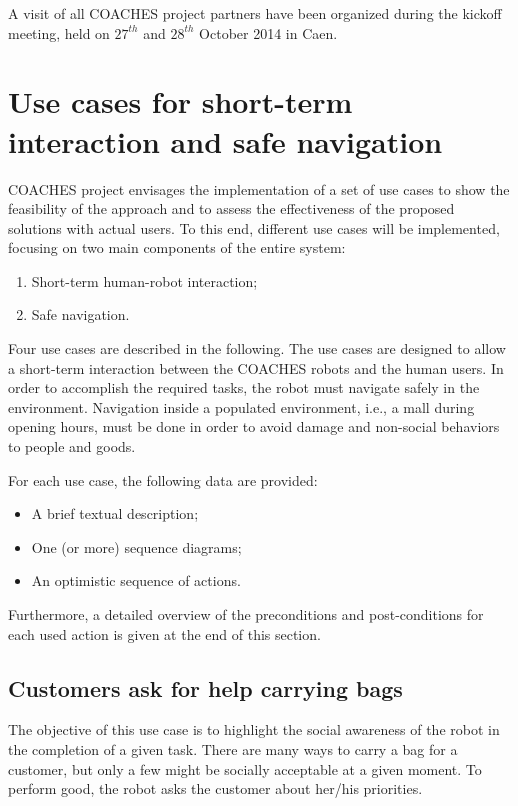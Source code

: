 A visit of all COACHES project partners have been organized during the kickoff meeting,
held on $27^{th}$ and $28^{th}$ October 2014 in Caen. 


\section{Use cases for short-term interaction and safe navigation}

COACHES project envisages the implementation of a set of use cases
to show the feasibility of the approach and to assess the effectiveness
of the proposed solutions with actual users.
To this end, different use cases will be implemented, focusing on two main
components of the entire system:
\begin{enumerate}
\item Short-term human-robot interaction;
\item Safe navigation.
\end{enumerate}

Four use cases are described in the following. The use cases are designed
to allow a short-term interaction between the COACHES robots and the human users.
In order to accomplish the required tasks, the robot must navigate
safely in the environment. Navigation inside a populated environment, i.e., a mall
during opening hours, must be done in order to avoid damage and non-social behaviors to people
and goods.

For each use case, the following data are provided:
\begin{itemize}
\item A brief textual description;
\item One (or more) sequence diagrams;
\item An optimistic sequence of actions.
\end{itemize}

Furthermore, a detailed overview of the preconditions and post-conditions for each used action is given at the end of this section.


\subsection{Customers ask for help carrying bags}

The objective of this use case is to highlight the social awareness
of the robot in the completion of a given task. There are many ways
to carry a bag for a customer, but only a few might be socially acceptable
at a given moment. To perform good, the robot asks the customer about her/his priorities.

